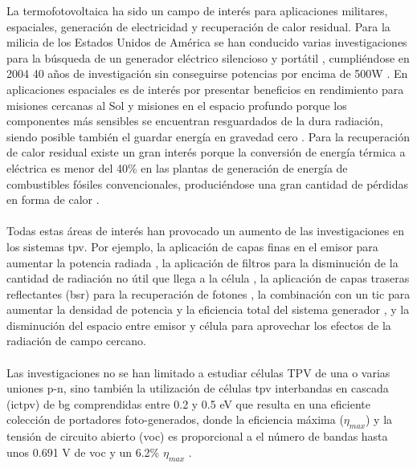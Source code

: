La termofotovoltaica ha sido un campo de interés para aplicaciones militares, espaciales, generación de electricidad y recuperación de calor residual. Para la milicia de los Estados Unidos de América se han conducido varias investigaciones para la búsqueda de un generador eléctrico silencioso y portátil \cite{military_TPV}, cumpliéndose en 2004 40 años de investigación sin conseguirse potencias por encima de 500W \cite{military_TPV_40Years}. En aplicaciones espaciales es de interés por presentar beneficios en rendimiento para misiones cercanas al Sol y misiones en el espacio profundo porque los componentes más sensibles se encuentran resguardados de la dura radiación, siendo posible también el guardar energía en gravedad cero \cite{TPV_space_applications}. Para la recuperación de calor residual existe un gran interés porque la conversión de energía térmica a eléctrica es menor del 40\% en las plantas de generación de energía de combustibles fósiles convencionales, produciéndose una gran cantidad de pérdidas en forma de calor \cite{wasteHeat_TPV}.\\\\
Todas estas áreas de interés han provocado un aumento de las investigaciones en los sistemas \acrshort{tpv}. Por ejemplo, la aplicación de capas finas en el emisor para aumentar la potencia radiada \cite{doi:Near_field_ThinFilm}, la aplicación de filtros  para la disminución de la cantidad de radiación no útil que llega a la célula \cite{multiLayerFilters}, la aplicación de capas traseras reflectantes (\acrshort{bsr}) para la recuperación de fotones \cite{thermoionic_TPV_NF}, la combinación con un \acrshort{tic} para aumentar la densidad de potencia y la eficiencia total del sistema generador \cite{thermoionic_TPV_NF,progress_Thermoionic_TPV}, y la disminución del espacio entre emisor y célula para aprovechar los efectos de la radiación de campo cercano\cite{thermoionic_TPV_NF,modelEfficiency_NF_TPV,nf_TPV_Pillars_SiO2}.\\\\
Las investigaciones no se han limitado a estudiar células TPV de una o varias uniones p-n, sino también la utilización de células \acrshort{tpv} interbandas en cascada (\acrshort{ictpv}) de \acrshort{bg} comprendidas entre 0.2 y 0.5 eV que resulta en una eficiente colección de portadores foto-generados, donde la eficiencia máxima ($\eta_{max}$) y la tensión de circuito abierto (\acrshort{voc}) es proporcional a el número de bandas hasta unos 0.691 V de \acrshort{voc} y un 6.2\% $\eta_{max}$ \cite{MultiEstados_Capas_TPVs}.\\\\
